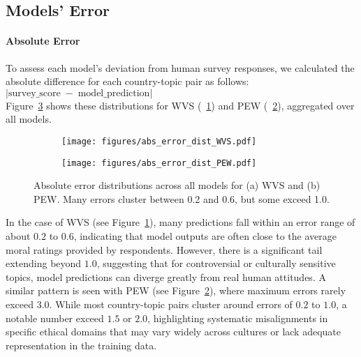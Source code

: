 \documentclass[11pt]{article}
\begin{document}
\subsection{Models' Error}

\paragraph{Absolute Error} To assess each model's deviation from human survey responses, we calculated the absolute difference for each country-topic pair as follows:
\\
$\left|\text{survey\_score} \;-\; \text{model\_prediction}\right|$
\\
Figure~\ref{fig:abs_error_dist} shows these distributions for WVS (~\ref{fig:abs_error_dist_wvs}) and PEW (~\ref{fig:abs_error_dist_pew}), aggregated over all models.

\begin{figure}[H]
    \centering
    \begin{subfigure}{0.24\textwidth}
        \centering
        \texttt{[image: figures/abs\_error\_dist\_WVS.pdf]}
        \caption{}
        \label{fig:abs_error_dist_wvs}
    \end{subfigure}%
    \hspace{-5pt}
    \begin{subfigure}{0.24\textwidth}
        \centering
        \texttt{[image: figures/abs\_error\_dist\_PEW.pdf]}
        \caption{}
        \label{fig:abs_error_dist_pew}
    \end{subfigure}
    \vspace{-8pt}
    \caption{\small Absolute error distributions across all models for (a) WVS and (b) PEW. Many errors cluster between 0.2 and 0.6, but some exceed 1.0.}
    \label{fig:abs_error_dist}
\end{figure}
\vspace{-8pt}
In the case of WVS (see Figure~\ref{fig:abs_error_dist_wvs}), many predictions fall within an error range of about \(0.2\) to \(0.6\), indicating that model outputs are often close to the average moral ratings provided by respondents. However, there is a significant tail extending beyond \(1.0\), suggesting that for controversial or culturally sensitive topics, model predictions can diverge greatly from real human attitudes. A similar pattern is seen with PEW (see Figure~\ref{fig:abs_error_dist_pew}), where maximum errors rarely exceed \(3.0\). While most country-topic pairs cluster around errors of \(0.2\) to \(1.0\), a notable number exceed \(1.5\) or \(2.0\), highlighting systematic misalignments in specific ethical domains that may vary widely across cultures or lack adequate representation in the training data.
\end{document}
